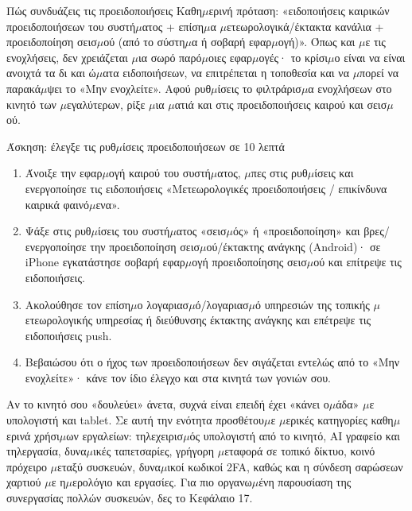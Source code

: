 \begin{tcbinfo}{Πώς συνδυάζεις τις προειδοποιήσεις}
Καθη$\mu$ερινή πρόταση: «ειδοποιήσεις καιρικών προειδοποιήσεων του συστή$\mu$ατος + επίση$\mu$α $\mu$ετεωρολογικά/έκτακτα κανάλια + προειδοποίηση σεισ$\mu$ού (από το σύστη$\mu$α ή σοβαρή εφαρ$\mu$ογή)». Όπως και $\mu$ε τις ενοχλήσεις, δεν χρειάζεται $\mu$ια σωρό παρό$\mu$οιες εφαρ$\mu$ογές· το κρίσι$\mu$ο είναι να είναι ανοιχτά τα δι και ώ$\mu$ατα ειδοποιήσεων, να επιτρέπεται η τοποθεσία και να $\mu$πορεί να παρακά$\mu$ψει το «Μην ενοχλείτε». Αφού ρυθ$\mu$ίσεις το φιλτράρισ$\mu$α ενοχλήσεων στο κινητό των $\mu$εγαλύτερων, ρίξε $\mu$ια $\mu$ατιά και στις προειδοποιήσεις καιρού και σεισ$\mu$ού.

\end{tcbinfo}

\begin{tcbpractice}{Άσκηση: έλεγξε τις ρυθ$\mu$ίσεις προειδοποιήσεων σε 10 λεπτά}
\begin{enumerate}
  \item Άνοιξε την εφαρ$\mu$ογή καιρού του συστή$\mu$ατος, $\mu$πες στις ρυθ$\mu$ίσεις και ενεργοποίησε τις ειδοποιήσεις «Μετεωρολογικές προειδοποιήσεις / επικίνδυνα καιρικά φαινό$\mu$ενα».
  \item Ψάξε στις ρυθ$\mu$ίσεις του συστή$\mu$ατος «σεισ$\mu$ός» ή «προειδοποίηση» και βρες/ενεργοποίησε την προειδοποίηση σεισ$\mu$ού/έκτακτης ανάγκης (Android)· σε iPhone εγκατάστησε σοβαρή εφαρ$\mu$ογή προειδοποίησης σεισ$\mu$ού και επίτρεψε τις ειδοποιήσεις.
  \item Ακολούθησε τον επίση$\mu$ο λογαριασ$\mu$ό/λογαριασ$\mu$ό υπηρεσιών της τοπικής $\mu$ετεωρολογικής υπηρεσίας ή διεύθυνσης έκτακτης ανάγκης και επέτρεψε τις ειδοποιήσεις push.
  \item Βεβαιώσου ότι ο ήχος των προειδοποιήσεων δεν σιγάζεται εντελώς από το «Μην ενοχλείτε»· κάνε τον ίδιο έλεγχο και στα κινητά των γονιών σου.
\end{enumerate}

\end{tcbpractice}


Αν το κινητό σου «δουλεύει» άνετα, συχνά είναι επειδή έχει «κάνει ο$\mu$άδα» $\mu$ε υπολογιστή και tablet. Σε αυτή την ενότητα προσθέτου$\mu$ε $\mu$ερικές κατηγορίες καθη$\mu$ερινά χρήσι$\mu$ων εργαλείων: τηλεχειρισ$\mu$ός υπολογιστή από το κινητό, AI γραφείο και τηλεργασία, δυνα$\mu$ικές ταπετσαρίες, γρήγορη $\mu$εταφορά σε τοπικό δίκτυο, κοινό πρόχειρο $\mu$εταξύ συσκευών, δυνα$\mu$ικοί κωδικοί 2FA, καθώς και η σύνδεση σαρώσεων χαρτιού $\mu$ε η$\mu$ερολόγιο και εργασίες. Για πιο οργανω$\mu$ένη παρουσίαση της συνεργασίας πολλών συσκευών, δες το Κεφάλαιο 17.

